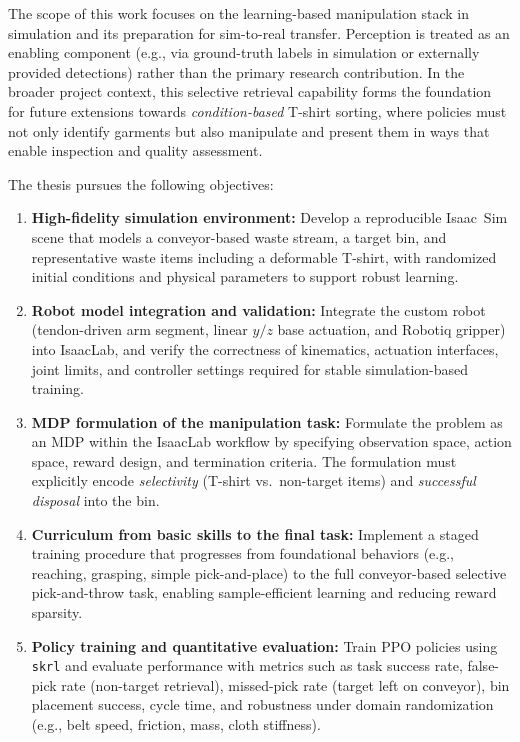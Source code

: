 The scope of this work focuses on the learning-based manipulation stack in simulation and its preparation for sim-to-real transfer. 
Perception is treated as an enabling component (e.g., via ground-truth labels in simulation or externally provided detections) rather than the primary research contribution. 
In the broader project context, this selective retrieval capability forms the foundation for future extensions towards \emph{condition-based} T-shirt sorting, where policies must not only identify garments but also manipulate and present them in ways that enable inspection and quality assessment.

The thesis pursues the following objectives:

\begin{enumerate}
  \item \textbf{High-fidelity simulation environment:}
  Develop a reproducible Isaac~Sim scene that models a conveyor-based waste stream, a target bin, and representative waste items including a deformable T-shirt, with randomized initial conditions and physical parameters to support robust learning.

  \item \textbf{Robot model integration and validation:}
  Integrate the custom robot (tendon-driven arm segment, linear $y/z$ base actuation, and Robotiq gripper) into IsaacLab, and verify the correctness of kinematics, actuation interfaces, joint limits, and controller settings required for stable simulation-based training.

  \item \textbf{\acs{MDP} formulation of the manipulation task:}
  Formulate the problem as an \ac{MDP} within the IsaacLab workflow by specifying observation space, action space, reward design, and termination criteria. The formulation must explicitly encode \emph{selectivity} (T-shirt vs.\ non-target items) and \emph{successful disposal} into the bin.

  \item \textbf{Curriculum from basic skills to the final task:}
  Implement a staged training procedure that progresses from foundational behaviors (e.g., reaching, grasping, simple pick-and-place) to the full conveyor-based selective pick-and-throw task, enabling sample-efficient learning and reducing reward sparsity.

  \item \textbf{Policy training and quantitative evaluation:}
  Train \ac{PPO} policies using \texttt{skrl} and evaluate performance with metrics such as task success rate, false-pick rate (non-target retrieval), missed-pick rate (target left on conveyor), bin placement success, cycle time, and robustness under domain randomization (e.g., belt speed, friction, mass, cloth stiffness).


\end{enumerate}
